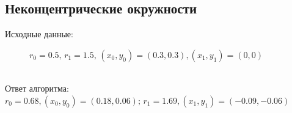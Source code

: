 \subsection{Неконцентрические окружности}
Исходные данные: \\
\begin{figure}[h]
\caption{$r_0 = 0.5, \, r_1 = 1.5, \, (x_0, y_0) = (0.3, 0.3), (x_1, y_1) = (0, 0)$}
\end{figure} \\
Ответ алгоритма: $r_0 = 0.68, (x_0, y_0) = (0.18, 0.06); \, r_1 = 1.69, (x_1, y_1) = (-0.09, -0.06) $
\begin{figure}[h]
\end{figure}\\
